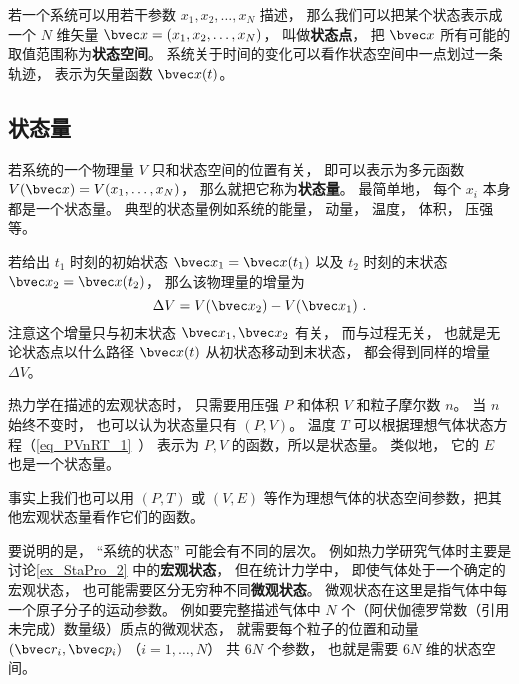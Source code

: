 

若一个系统可以用若干参数 $x_1, x_2,  \dots, x_N$ 描述， 那么我们可以把某个状态表示成一个 $N$ 维矢量 $\bvec x = (x_1, x_2, \dots, x_N)$， 叫做\textbf{状态点}， 把 $\bvec x$ 所有可能的取值范围称为\textbf{状态空间}。 系统关于时间的变化可以看作状态空间中一点划过一条轨迹， 表示为矢量函数 $\bvec x(t)$。

\subsection{状态量}
若系统的一个物理量 $V$ 只和状态空间的位置有关， 即可以表示为多元函数 $V(\bvec x) = V(x_1, \dots, x_N)$， 那么就把它称为\textbf{状态量}。 最简单地， 每个 $x_i$ 本身都是一个状态量。 典型的状态量例如系统的能量， 动量， 温度， 体积， 压强等。

若给出 $t_1$ 时刻的初始状态 $\bvec x_1 = \bvec x(t_1)$ 以及 $t_2$ 时刻的末状态 $\bvec x_2 = \bvec x(t_2)$， 那么该物理量的增量为
\begin{equation}
\Delta V = V(\bvec x_2) - V(\bvec x_1)~.
\end{equation}
注意这个增量只与初末状态 $\bvec x_1,\bvec x_2$ 有关， 而与过程无关， 也就是无论状态点以什么路径 $\bvec x(t)$ 从初状态移动到末状态， 都会得到同样的增量 $\Delta V$。

\begin{example}{}\label{ex_StaPro_2}
热力学在描述的宏观状态时， 只需要用压强 $P$ 和体积 $V$ 和粒子摩尔数 $n$。 当 $n$ 始终不变时， 也可以认为状态量只有 $(P,V)$。 温度 $T$ 可以根据理想气体状态方程（\autoref{eq_PVnRT_1}~） 表示为 $P,V$ 的函数，所以是状态量。 类似地， 它的 $E$ 也是一个状态量。

事实上我们也可以用 $(P,T)$ 或 $(V,E)$ 等作为理想气体的状态空间参数，把其他宏观状态量看作它们的函数。
\end{example}

要说明的是， “系统的状态” 可能会有不同的层次。 例如热力学研究气体时主要是讨论\autoref{ex_StaPro_2} 中的\textbf{宏观状态}， 但在统计力学中， 即使气体处于一个确定的宏观状态， 也可能需要区分无穷种不同\textbf{微观状态}。 微观状态在这里是指气体中每一个原子分子的运动参数。 例如要完整描述气体中 $N$ 个（阿伏伽德罗常数（引用未完成）数量级）质点的微观状态， 就需要每个粒子的位置和动量 $(\bvec r_i, \bvec p_i)$ （$i=1,\dots,N$） 共 $6N$ 个参数， 也就是需要 $6N$ 维的状态空间。


